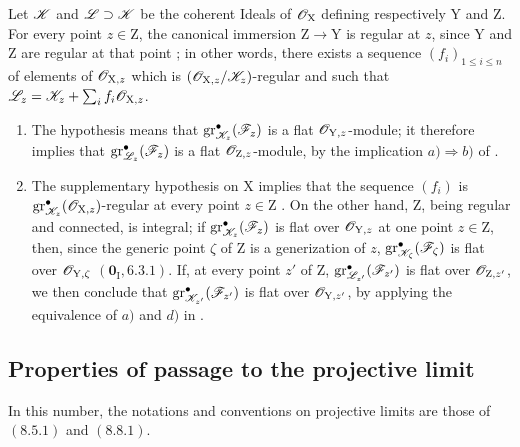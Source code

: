 Let $\mathscr{K}$ and $\mathscr{L}\supset\mathscr{K}$ be the coherent Ideals of $\mathscr{O}_\mathrm{X}$ defining respectively $\mathrm{Y}$ and $\mathrm{Z}$. For every point $z\in\mathrm{Z}$, the canonical immersion $\mathrm{Z}\to\mathrm{Y}$ is regular at $z$, since $\mathrm{Y}$ and $\mathrm{Z}$ are regular at that point ; in other words, there exists a sequence $(f_i)_{1\leqslant i\leqslant n}$ of elements of $\mathscr{O}_{\mathrm{X},z}$ which is $(\mathscr{O}_{\mathrm{X},z}/\mathscr{K}_z)$-regular and such that $\mathscr{L}_z=\mathscr{K}_z+\sum_i f_i\mathscr{O}_{\mathrm{X},z}$.
\begin{enumerate}
\item[\rm(i)] The hypothesis means that $\operatorname{gr}_{\mathscr{K}_z}^\bullet(\mathscr{F}_z)$ is a flat $\mathscr{O}_{\mathrm{Y},z}$-module; it therefore implies that $\operatorname{gr}_{\mathscr{L}_z}^\bullet(\mathscr{F}_z)$ is a flat $\mathscr{O}_{\mathrm{Z},z}$-module, by the implication $a)\Rightarrow b)$ of .
\item[\rm(ii)] The supplementary hypothesis on $\mathrm{X}$ implies that the sequence $(f_i)$ is $\operatorname{gr}_{\mathscr{K}_z}^\bullet(\mathscr{O}_{\mathrm{X},z})$-regular at every point $z\in\mathrm{Z}$ . On the other hand, $\mathrm{Z}$, being regular and connected, is integral; if $\operatorname{gr}_{\mathscr{K}_z}^\bullet(\mathscr{F}_z)$ is flat over $\mathscr{O}_{\mathrm{Y},z}$ at one point $z\in\mathrm{Z}$, then, since the generic point $\zeta$ of $\mathrm{Z}$ is a generization of $z$, $\operatorname{gr}_{\mathscr{K}_\zeta}^\bullet(\mathscr{F}_\zeta)$ is flat over $\mathscr{O}_{\mathrm{Y},\zeta}$ $(\mathbf{0}_\mathrm{I},6.3.1)$. If, at every point $z'$ of $\mathrm{Z}$, $\operatorname{gr}_{\mathscr{L}_{z'}}^\bullet(\mathscr{F}_{z'})$ is flat over $\mathscr{O}_{\mathrm{Z},z'}$, we then conclude that $\operatorname{gr}_{\mathscr{K}_{z'}}^\bullet(\mathscr{F}_{z'})$ is flat over $\mathscr{O}_{\mathrm{Y},z'}$, by applying the equivalence of $a)$ and $d)$ in .
\end{enumerate}

\subsection{Properties of passage to the projective limit}
\label{subsection:IV.19.8}
\label{IV.19.8}

In this number, the notations and conventions on projective limits are those of $(8.5.1)$ and $(8.8.1)$.

